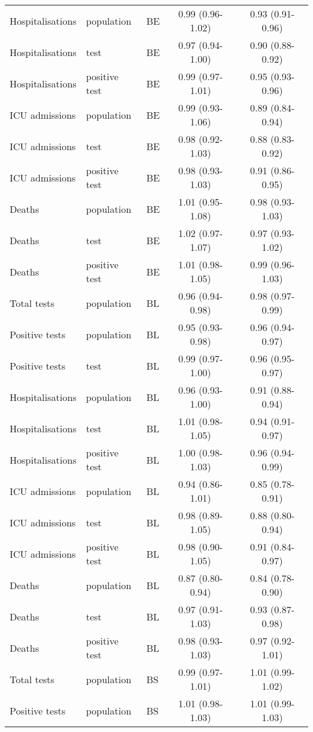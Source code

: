 \documentclass{article}
\begin{document}
\begin{longtable}{lllcc}
		Hospitalisations & population & BE & 0.99 (0.96-1.02) & 0.93 (0.91-0.96) \\ 
		Hospitalisations & test & BE & 0.97 (0.94-1.00) & 0.90 (0.88-0.92) \\ 
		Hospitalisations & positive test & BE & 0.99 (0.97-1.01) & 0.95 (0.93-0.96) \\ 
		ICU admissions & population & BE & 0.99 (0.93-1.06) & 0.89 (0.84-0.94) \\ 
		ICU admissions & test & BE & 0.98 (0.92-1.03) & 0.88 (0.83-0.92) \\ 
		ICU admissions & positive test & BE & 0.98 (0.93-1.03) & 0.91 (0.86-0.95) \\ 
		Deaths & population & BE & 1.01 (0.95-1.08) & 0.98 (0.93-1.03) \\ 
		Deaths & test & BE & 1.02 (0.97-1.07) & 0.97 (0.93-1.02) \\ 
		Deaths & positive test & BE & 1.01 (0.98-1.05) & 0.99 (0.96-1.03) \\ 
		Total tests & population & BL & 0.96 (0.94-0.98) & 0.98 (0.97-0.99) \\ 
		Positive tests & population & BL & 0.95 (0.93-0.98) & 0.96 (0.94-0.97) \\ 
		Positive tests & test & BL & 0.99 (0.97-1.00) & 0.96 (0.95-0.97) \\ 
		Hospitalisations & population & BL & 0.96 (0.93-1.00) & 0.91 (0.88-0.94) \\ 
		Hospitalisations & test & BL & 1.01 (0.98-1.05) & 0.94 (0.91-0.97) \\ 
		Hospitalisations & positive test & BL & 1.00 (0.98-1.03) & 0.96 (0.94-0.99) \\ 
		ICU admissions & population & BL & 0.94 (0.86-1.01) & 0.85 (0.78-0.91) \\ 
		ICU admissions & test & BL & 0.98 (0.89-1.05) & 0.88 (0.80-0.94) \\ 
		ICU admissions & positive test & BL & 0.98 (0.90-1.05) & 0.91 (0.84-0.97) \\ 
		Deaths & population & BL & 0.87 (0.80-0.94) & 0.84 (0.78-0.90) \\ 
		Deaths & test & BL & 0.97 (0.91-1.03) & 0.93 (0.87-0.98) \\ 
		Deaths & positive test & BL & 0.98 (0.93-1.03) & 0.97 (0.92-1.01) \\ 
		Total tests & population & BS & 0.99 (0.97-1.01) & 1.01 (0.99-1.02) \\ 
		Positive tests & population & BS & 1.01 (0.98-1.03) & 1.01 (0.99-1.03) \\ 

\end{longtable}
\end{document}
